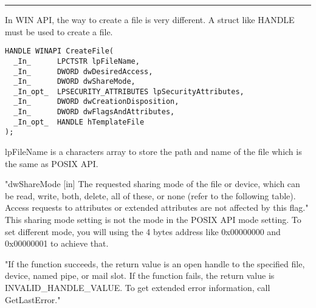 \documentclass[letterpaper,12pt,titlepage]{article}
\begin{document}
\noindent\rule{15.5cm}{0.4pt}
In WIN API, the way to create a file is very different. A struct like HANDLE must be used to create a file. \par
\begin{verbatim}
HANDLE WINAPI CreateFile(
  _In_      LPCTSTR lpFileName,
  _In_      DWORD dwDesiredAccess,
  _In_      DWORD dwShareMode,
  _In_opt_  LPSECURITY_ATTRIBUTES lpSecurityAttributes,
  _In_      DWORD dwCreationDisposition,
  _In_      DWORD dwFlagsAndAttributes,
  _In_opt_  HANDLE hTemplateFile
);
\end{verbatim}
lpFileName is a characters array to store the path and name of the file which is the same as POSIX API.\par
"dwShareMode [in] The requested sharing mode of the file or device, which can be read, write, both, delete, all of these, or none (refer to the following table). Access requests to attributes or extended attributes are not affected by this flag." This sharing mode setting is not the mode in the POSIX API mode setting. To set different mode, you will using the 4 bytes address like 0x00000000 and 0x00000001 to achieve that.\par
"If the function succeeds, the return value is an open handle to the specified file, device, named pipe, or mail slot. If the function fails, the return value is INVALID\_HANDLE\_VALUE. To get extended error information, call GetLastError."\par
\par
\end{document}
